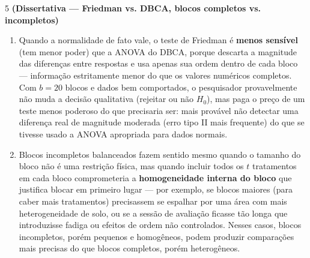\documentclass[11pt]{article}
\begin{document}
\begin{questao}{5} \textbf{(Dissertativa --- Friedman vs. DBCA, blocos completos vs. incompletos)}
\end{questao}
\begin{solucao}
\begin{enumerate}[label=(\alph*)]
  \item Quando a normalidade de fato vale, o teste de Friedman é \textbf{menos sensível} (tem
    menor poder) que a ANOVA do DBCA, porque descarta a magnitude das diferenças entre respostas
    e usa apenas sua ordem dentro de cada bloco — informação estritamente menor do que os valores
    numéricos completos. Com $b=20$ blocos e dados bem comportados, o pesquisador provavelmente
    não muda a decisão qualitativa (rejeitar ou não $H_0$), mas paga o preço de um teste menos
    poderoso do que precisaria ser: mais provável não detectar uma diferença real de magnitude
    moderada (erro tipo II mais frequente) do que se tivesse usado a ANOVA apropriada para dados
    normais.
  \item Blocos incompletos balanceados fazem sentido mesmo quando o tamanho do bloco não é uma
    restrição física, mas quando incluir todos os $t$ tratamentos em cada bloco comprometeria a
    \textbf{homogeneidade interna do bloco} que justifica blocar em primeiro lugar — por exemplo,
    se blocos maiores (para caber mais tratamentos) precisassem se espalhar por uma área com mais
    heterogeneidade de solo, ou se a sessão de avaliação ficasse tão longa que introduzisse fadiga
    ou efeitos de ordem não controlados. Nesses casos, blocos incompletos, porém pequenos e
    homogêneos, podem produzir comparações mais precisas do que blocos completos, porém
    heterogêneos.
\end{enumerate}
\end{solucao}
\end{document}
